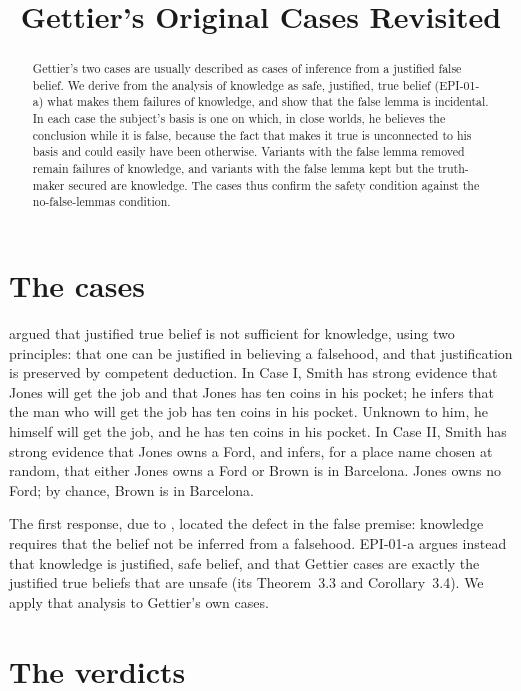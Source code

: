 \documentclass{situationist-preprint}
\title{Gettier's Original Cases Revisited}
\begin{document}
\maketitle

\begin{abstract}
Gettier's two cases are usually described as cases of inference from a justified false belief. We derive from the analysis of knowledge as safe, justified, true belief (EPI-01-a) what makes them failures of knowledge, and show that the false lemma is incidental. In each case the subject's basis is one on which, in close worlds, he believes the conclusion while it is false, because the fact that makes it true is unconnected to his basis and could easily have been otherwise. Variants with the false lemma removed remain failures of knowledge, and variants with the false lemma kept but the truth-maker secured are knowledge. The cases thus confirm the safety condition against the no-false-lemmas condition.
\end{abstract}

\section{The cases}

\citet{Gettier1963} argued that justified true belief is not sufficient for knowledge, using two principles: that one can be justified in believing a falsehood, and that justification is preserved by competent deduction. In Case I, Smith has strong evidence that Jones will get the job and that Jones has ten coins in his pocket; he infers that the man who will get the job has ten coins in his pocket. Unknown to him, he himself will get the job, and he has ten coins in his pocket. In Case II, Smith has strong evidence that Jones owns a Ford, and infers, for a place name chosen at random, that either Jones owns a Ford or Brown is in Barcelona. Jones owns no Ford; by chance, Brown is in Barcelona.

The first response, due to \citet{Clark1963}, located the defect in the false premise: knowledge requires that the belief not be inferred from a falsehood. EPI-01-a argues instead that knowledge is justified, safe belief, and that Gettier cases are exactly the justified true beliefs that are unsafe (its Theorem~3.3 and Corollary~3.4). We apply that analysis to Gettier's own cases.

\section{The verdicts}
\end{document}
